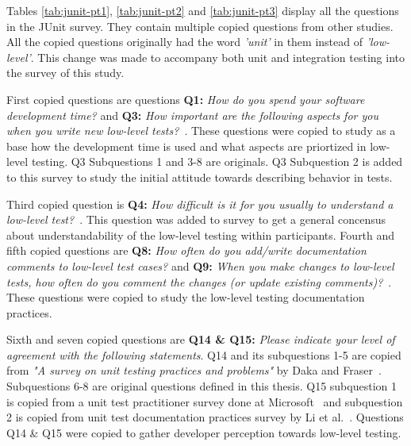 \restoregeometry
Tables \ref{tab:junit-pt1}, \ref{tab:junit-pt2} and \ref{tab:junit-pt3} display all the questions in the JUnit survey.
They contain multiple copied questions from other
studies. All the copied questions originally had the word \textit{'unit'} in them instead of \textit{'low-level'}. This change
was made to accompany both unit and integration testing into the survey of this study.

First copied questions are questions \textbf{Q1:} \textit{How do you spend your software development time?} and
\textbf{Q3:} \textit{How important are the following aspects for you when you write new low-level tests?}~\cite{daka2014survey}.
These questions were copied to study as a base how the development time is used and what aspects are priortized in low-level testing.
Q3 Subquestions 1 and 3-8 are originals. Q3 Subquestion 2 is added to this survey to study the initial attitude towards describing behavior
in tests.

Third copied question is \textbf{Q4:} \textit{How difficult is it for you usually to understand a low-level test?}~\cite{li2016automatically}.
This question was added to survey to get a general concensus about understandability of the low-level testing within participants.
Fourth and fifth copied questions are \textbf{Q8:} \textit{How often do you add/write documentation comments to low-level test cases?} and
\textbf{Q9:} \textit{When you make changes to low-level tests, how often do you comment the changes (or update existing comments)?}~\cite{li2016automatically}.
These questions were copied to study the low-level testing documentation practices.

Sixth and seven copied questions are \textbf{Q14 \& Q15:} \textit{Please indicate your level of agreement with the following statements}.
Q14 and its subquestions 1-5 are copied from \textit{"A survey on unit testing practices and problems"} by Daka and Fraser~\cite{daka2014survey}.
Subquestions 6-8 are original questions defined in this thesis. Q15 subquestion 1 is copied from a unit test practitioner
survey done at Microsoft~\cite{williams2009effectiveness} and subquestion 2 is copied from unit test documentation
practices survey by Li et al.~\cite{li2016automatically}. Questions Q14 \& Q15 were copied to gather developer perception
towards low-level testing.



